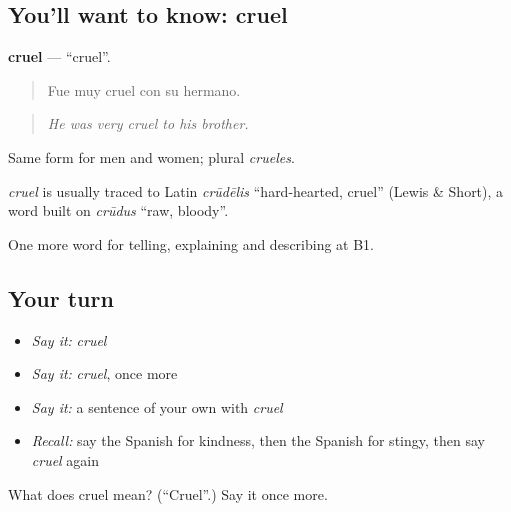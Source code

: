 \subsection*{You'll want to know: cruel}
\textbf{cruel} — \textquotedblleft{}cruel\textquotedblright{}.

\begin{quote}
Fue muy cruel con su hermano.
\end{quote}

\begin{quote}
\emph{He was very cruel to his brother.}
\end{quote}

Same form for men and women; plural \emph{crueles}.

\begin{cousinweb}
\emph{cruel} is usually traced to Latin \emph{crūdēlis} \textquotedblleft{}hard-hearted, cruel\textquotedblright{} (Lewis \& Short), a word built on \emph{crūdus} \textquotedblleft{}raw, bloody\textquotedblright{}.
\end{cousinweb}

\begin{grammarlens}[title={What you've built}]
One more word for telling, explaining and describing at B1.
\end{grammarlens}

\subsection*{Your turn}
\begin{itemize}
\raggedright
  \item \emph{Say it:} \emph{cruel}
  \item \emph{Say it:} \emph{cruel}, once more
  \item \emph{Say it:} a sentence of your own with \emph{cruel}
  \item \emph{Recall:} say the Spanish for kindness, then the Spanish for stingy, then say \emph{cruel} again
\end{itemize}

\begin{tcolorbox}[breakable,colback=teal!4,colframe=teal!35!black,title={Before you move on}]
What does cruel mean? (\textquotedblleft{}Cruel\textquotedblright{}.) Say it once more.
\end{tcolorbox}
